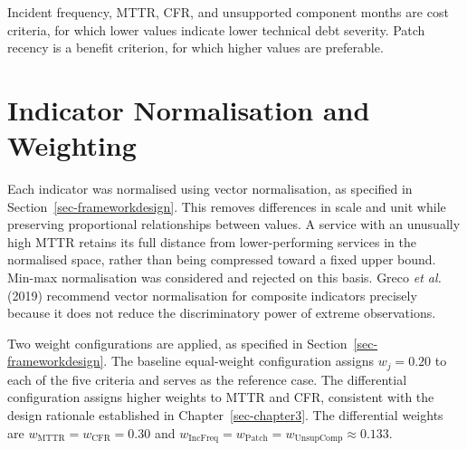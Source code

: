 \documentclass[
  12pt,
  letterpaper,
  12pt,
  oneside,
  english,
  onehalfspacing,
  headsepline]{MastersDoctoralThesis}
\begin{document}
Incident frequency, MTTR, CFR, and unsupported component months are cost
criteria, for which lower values indicate lower technical debt severity.
Patch recency is a benefit criterion, for which higher values are
preferable.

\section{Indicator Normalisation and
Weighting}\label{indicator-normalisation-and-weighting}

Each indicator was normalised using vector normalisation, as specified
in Section~\ref{sec-frameworkdesign}. This removes differences in scale
and unit while preserving proportional relationships between values. A
service with an unusually high MTTR retains its full distance from
lower-performing services in the normalised space, rather than being
compressed toward a fixed upper bound. Min-max normalisation was
considered and rejected on this basis. Greco \emph{et al.} (2019)
recommend vector normalisation for composite indicators precisely
because it does not reduce the discriminatory power of extreme
observations.

Two weight configurations are applied, as specified in
Section~\ref{sec-frameworkdesign}. The baseline equal-weight
configuration assigns \(w_j = 0.20\) to each of the five criteria and
serves as the reference case. The differential configuration assigns
higher weights to MTTR and CFR, consistent with the design rationale
established in Chapter~\ref{sec-chapter3}. The differential weights are
\(w_{\text{MTTR}} = w_{\text{CFR}} = 0.30\) and
\(w_{\text{IncFreq}} = w_{\text{Patch}} = w_{\text{UnsupComp}} \approx 0.133\).
\end{document}
